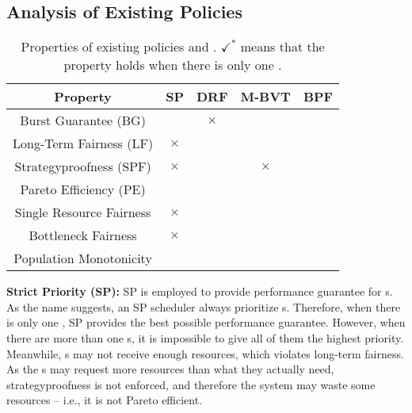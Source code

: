 \subsection{Analysis of Existing Policies}
\label{sec:property-analysis}


\begin{table}[!t]
	\small
	\centering
	\begin{tabular}{ |c||c|c|c||c| } 
		\hline
		Property  & SP  & DRF  & M-BVT  & BPF \\   [0.5ex] 
		\hline\hline
		Burst Guarantee (BG)    &  \checkmark* &$\times$ & \checkmark*  &\checkmark \\ 
		Long-Term Fairness (LF) & $\times$ & \checkmark &\checkmark &  \checkmark \\
		Strategyproofness (SPF)  & $\times$ & \checkmark& $\times$ & \checkmark\\
		Pareto Efficiency (PE)  & \checkmark & \checkmark &\checkmark & \checkmark \\
		\hline \hline 
		Single Resource Fairness & $\times$  & \checkmark & \checkmark & \checkmark \\
		Bottleneck Fairness & $\times$  & \checkmark & \checkmark & \checkmark \\
		Population Monotonicity & \checkmark  & \checkmark & \checkmark & \checkmark \\
		\hline
	\end{tabular}
	\caption{Properties of existing policies and {\name}. $\checkmark^*$ means that the property holds when there is only one \burstq.}
	\label{tab-properties}
	\vspace{-0.1in}
\end{table}



\textbf{Strict Priority (SP): }
SP is employed to provide performance guarantee for {\burstq}s. As the name suggests, an SP scheduler always prioritize {\burstq}s. Therefore, when there is only one \burstq, SP provides the best possible performance guarantee. 
However, when there are more than one {\burstq}s, it is impossible to give all of them the highest priority. Meanwhile, {\batchq}s may not receive enough resources, which violates long-term fairness. As the {\burstq}s may request more resources than what they actually need, strategyproofness is not enforced, and therefore the system may waste some resources -- i.e., it is not Pareto efficient. 

